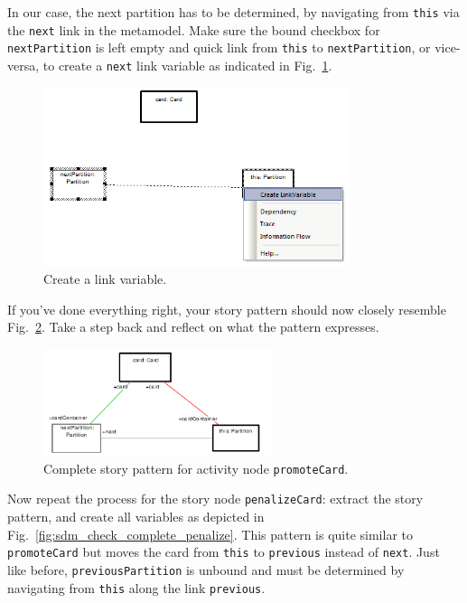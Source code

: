 In our case, the next partition has to be determined, by navigating from
\texttt{this} via the \texttt{next} link in the metamodel.  Make sure the bound
checkbox for \texttt{nextPartition} is left empty and quick link from
\texttt{this} to \texttt{nextPartition}, or vice-versa, to create a
\texttt{next} link variable as indicated in
Fig.~\ref{fig:sdm_check_link_variable}.

\begin{figure}[htbp]
\begin{center}
  \includegraphics[width=0.8\textwidth]{pics/sdmBilder/check/sdm26}
  \caption{Create a link variable.}
  \label{fig:sdm_check_link_variable}
\end{center}
\end{figure}

If you've done everything right, your story pattern should now closely resemble
Fig.~\ref{fig:sdm_check_complete_activity_node}.  Take a step back and reflect
on what the pattern expresses.

\begin{figure}[htbp]
\begin{center}
  \includegraphics[width=0.6\textwidth]{pics/sdmBilder/check/sdm30}
  \caption{Complete story pattern for activity node \texttt{promoteCard}.}
  \label{fig:sdm_check_complete_activity_node}
\end{center}
\end{figure}

Now repeat the process for the story node \texttt{penalizeCard}: extract the
story pattern, and create all variables as depicted in
Fig.~\ref{fig:sdm_check_complete_penalize}.  This pattern is quite similar to
\texttt{promoteCard} but moves the card from \texttt{this} to \texttt{previous}
instead of \texttt{next}.  Just like before, \texttt{previousPartition} is
unbound and must be determined by navigating from \texttt{this} along the link
\texttt{previous}.

